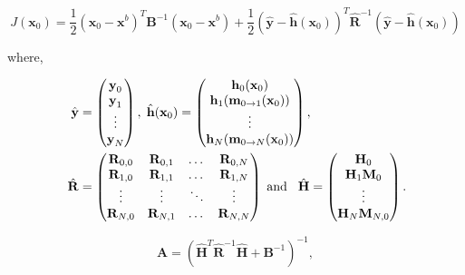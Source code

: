 \documentclass[12pt]{article}
\begin{document}
\begin{equation}
J(\textbf{x}_0) = \frac{1}{2}(\textbf{x}_0-\textbf{x}^b)^{T}\textbf{B}^{-1}(\textbf{x}_0-\textbf{x}^b)+\frac{1}{2}(\hat{\textbf{y}}-\hat{\textbf{h}}(\textbf{x}_0))^{T}\hat{\textbf{R}}^{-1}(\hat{\textbf{y}}-\hat{\textbf{h}}(\textbf{x}_0)) \label{costfn}
\end{equation}


where,

\begin{equation}
\begin{split}
\hat{\textbf{y}} &=
\begin{pmatrix}
\textbf{y}_0 \\
\textbf{y}_1\\
\vdots \\
\textbf{y}_N
\end{pmatrix},
\hspace{1mm}
\hat{\textbf{h}}(\textbf{x}_0)=
\begin{pmatrix}
\textbf{h}_0(\textbf{x}_0) \\
\textbf{h}_1(\textbf{m}_{0\rightarrow 1}(\mathbf{x}_{0}))\\
\vdots \\
\textbf{h}_N(\textbf{m}_{0\rightarrow N}(\mathbf{x}_{0}))
\end{pmatrix}, \\
\hspace{1mm}
\hat{\mathbf{R}} &=
\begin{pmatrix}
\mathbf{R}_{0, 0} & \mathbf{R}_{0, 1} & \dots & \mathbf{R}_{0, N} \\
\mathbf{R}_{1, 0} & \mathbf{R}_{1, 1} & \dots & \mathbf{R}_{1, N} \\
\vdots & \vdots & \ddots & \vdots \\
\mathbf{R}_{N, 0} & \mathbf{R}_{N, 1} & \dots & \mathbf{R}_{N, N}
\end{pmatrix}
\hspace{1mm} \text{and} \hspace{3mm}
\hat{\mathbf{H}}=
\begin{pmatrix}
\mathbf{H}_0 \\
\mathbf{H}_1\mathbf{M}_0\\
\vdots \\
\mathbf{H}_N\mathbf{M}_{N,0}
\end{pmatrix}.
\end{split}
\end{equation}

\begin{equation}
\textbf{A} = (\hat{\textbf{H}}^{T}\hat{\textbf{R}}^{-1}\hat{\textbf{H}}+\textbf{B}^{-1})^{-1}, \label{eqn:a_cov_4dvar}
\end{equation}
\end{document}
